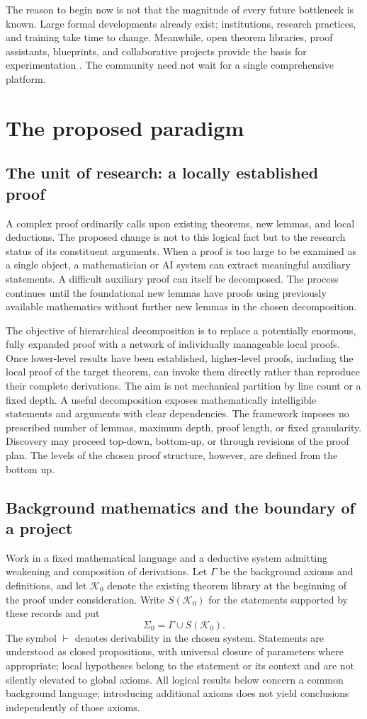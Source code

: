 \documentclass[11pt,a4paper]{article}
\theoremstyle{definition}\newtheorem{definition}{Definition}
\newcommand{\K}{\mathcal K}
\begin{document}
The reason to begin now is not that the magnitude of every future bottleneck is known. Large formal developments already exist; institutions, research practices, and training take time to change. Meanwhile, open theorem libraries, proof assistants, blueprints, and collaborative projects provide the basis for experimentation \cite{mathlib,kontorovich,architect,polymath}. The community need not wait for a single comprehensive platform.

\section{The proposed paradigm}
\subsection{The unit of research: a locally established proof}
A complex proof ordinarily calls upon existing theorems, new lemmas, and local deductions. The proposed change is not to this logical fact but to the research status of its constituent arguments. When a proof is too large to be examined as a single object, a mathematician or AI system can extract meaningful auxiliary statements. A difficult auxiliary proof can itself be decomposed. The process continues until the foundational new lemmas have proofs using previously available mathematics without further new lemmas in the chosen decomposition.

The objective of hierarchical decomposition is to replace a potentially enormous, fully expanded proof with a network of individually manageable local proofs. Once lower-level results have been established, higher-level proofs, including the local proof of the target theorem, can invoke them directly rather than reproduce their complete derivations. The aim is not mechanical partition by line count or a fixed depth. A useful decomposition exposes mathematically intelligible statements and arguments with clear dependencies. The framework imposes no prescribed number of lemmas, maximum depth, proof length, or fixed granularity. Discovery may proceed top-down, bottom-up, or through revisions of the proof plan. The levels of the chosen proof structure, however, are defined from the bottom up.

\subsection{Background mathematics and the boundary of a project}
Work in a fixed mathematical language and a deductive system admitting weakening and composition of derivations. Let $\Gamma$ be the background axioms and definitions, and let $\K_0$ denote the existing theorem library at the beginning of the proof under consideration. Write $S(\K_0)$ for the statements supported by these records and put
\[
 \Sigma_0=\Gamma\cup S(\K_0).
\]
The symbol $\vdash$ denotes derivability in the chosen system. Statements are understood as closed propositions, with universal closure of parameters where appropriate; local hypotheses belong to the statement or its context and are not silently elevated to global axioms. All logical results below concern a common background language; introducing additional axioms does not yield conclusions independently of those axioms.
\end{document}
